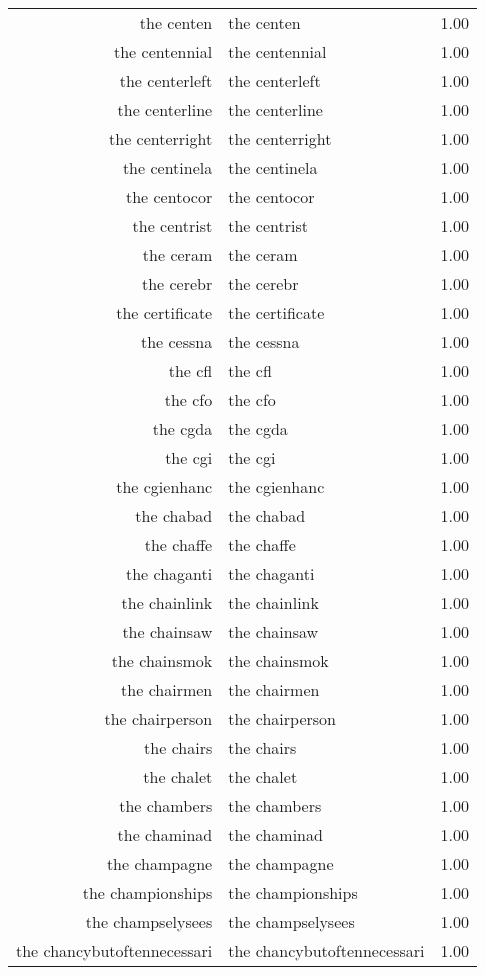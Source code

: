 \begin{table}[ht]
\begin{tabular}{rlr}
  the centen & the centen & 1.00 \\ 
  the centennial & the centennial & 1.00 \\ 
  the centerleft & the centerleft & 1.00 \\ 
  the centerline & the centerline & 1.00 \\ 
  the centerright & the centerright & 1.00 \\ 
  the centinela & the centinela & 1.00 \\ 
  the centocor & the centocor & 1.00 \\ 
  the centrist & the centrist & 1.00 \\ 
  the ceram & the ceram & 1.00 \\ 
  the cerebr & the cerebr & 1.00 \\ 
  the certificate & the certificate & 1.00 \\ 
  the cessna & the cessna & 1.00 \\ 
  the cfl & the cfl & 1.00 \\ 
  the cfo & the cfo & 1.00 \\ 
  the cgda & the cgda & 1.00 \\ 
  the cgi & the cgi & 1.00 \\ 
  the cgienhanc & the cgienhanc & 1.00 \\ 
  the chabad & the chabad & 1.00 \\ 
  the chaffe & the chaffe & 1.00 \\ 
  the chaganti & the chaganti & 1.00 \\ 
  the chainlink & the chainlink & 1.00 \\ 
  the chainsaw & the chainsaw & 1.00 \\ 
  the chainsmok & the chainsmok & 1.00 \\ 
  the chairmen & the chairmen & 1.00 \\ 
  the chairperson & the chairperson & 1.00 \\ 
  the chairs & the chairs & 1.00 \\ 
  the chalet & the chalet & 1.00 \\ 
  the chambers & the chambers & 1.00 \\ 
  the chaminad & the chaminad & 1.00 \\ 
  the champagne & the champagne & 1.00 \\ 
  the championships & the championships & 1.00 \\ 
  the champselysees & the champselysees & 1.00 \\ 
  the chancybutoftennecessari & the chancybutoftennecessari & 1.00 \\ 

\end{tabular}
\end{table}
